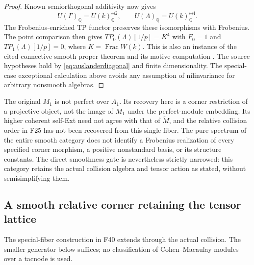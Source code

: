 \documentclass[11pt,a4paper]{article}
\newcommand{\Q}{\mathbb Q}\newcommand{\Z}{\mathbb Z}\newcommand{\C}{\mathbb C}\newcommand{\N}{\mathbb N}\newcommand{\F}{\mathbb F}
\renewcommand{\S}{\ensuremath{\mathsection}}
\newcommand{\fid}[1]{\textsf{#1}}\newcommand{\gate}[1]{\textsf{#1}}
\theoremstyle{named}\newtheorem{finding}{Finding}[section]
\theoremstyle{definition}\newtheorem{definition}[finding]{Definition}
\theoremstyle{remark}\newtheorem{remark}[finding]{Remark}
\begin{document}
\begin{proof}
Known semiorthogonal additivity
\cite[Example~12.3, p.~24]{TabuadaWeil} now gives
\[
 U(\Gamma)_{\Q}=U(k)_{\Q}^{\oplus2},\qquad
 U(\Lambda)_{\Q}=U(k)_{\Q}^{\oplus4}.
\]
The Frobenius-enriched TP functor
\cite[\S6.2, equation~(6.9), p.~16]{TabuadaWeil}
preserves these isomorphisms with Frobenius. The point comparison
\cite[\S7, equations~(7.1)--(7.4), p.~17]{TabuadaWeil}
then gives $TP_0(\Lambda)[1/p]=K^4$ with $F_0=1$ and
$TP_1(\Lambda)[1/p]=0$, where $K=\operatorname{Frac}W(k)$.
This is also an instance of the cited connective smooth proper
theorem and its motive computation
\cite[Theorem~2.12, p.~8; proof, equation~(12.6), p.~26]{TabuadaWeil}.
The source hypotheses hold by \eqref{eq:auslanderdiagonal} and
finite dimensionality. The special-case exceptional calculation
above avoids any assumption of nilinvariance for arbitrary
nonsmooth algebras.
\end{proof}

The original $M_1$ is not perfect over $A_1$. Its recovery here
is a corner restriction of a projective object, not the image of
$M_1$ under the perfect-module embedding. Its higher coherent
self-Ext need not agree with that of $\widetilde M$, and the
relative collision order in \fid{F25} has not been recovered
from this single fiber. The pure spectrum of the entire smooth
category does not identify a Frobenius realization of every
specified corner morphism, a positive nonstandard basis, or its
structure constants. The direct smoothness gate is nevertheless
strictly narrowed: this category retains the actual collision
algebra and tensor action as stated, without semisimplifying them.


\subsection{A smooth relative corner retaining the tensor lattice}
The special-fiber construction in \fid{F40} extends through the
actual collision. The smaller generator below suffices; no
classification of Cohen--Macaulay modules over a tacnode is used.
\end{document}
